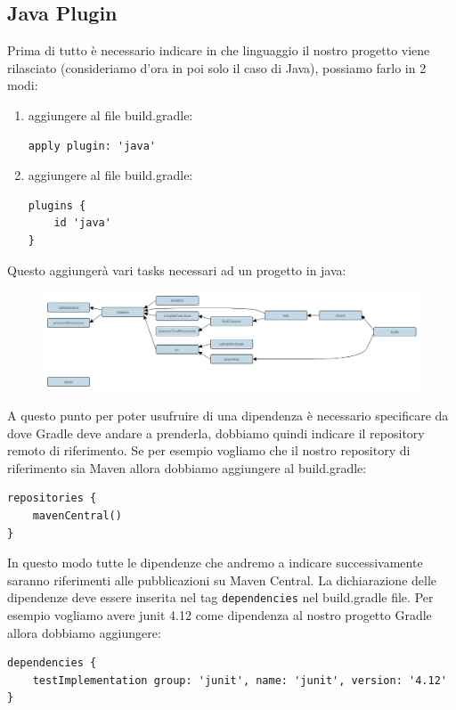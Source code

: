 \subsection{Java Plugin}
Prima di tutto è necessario indicare in che linguaggio il nostro progetto viene rilasciato (consideriamo d'ora in poi solo il caso di Java), possiamo farlo in 2 modi:
\begin{enumerate}
    \item aggiungere al file build.gradle:
    \begin{lstlisting}[frame=single]
apply plugin: 'java' \end{lstlisting}
    \item aggiungere al file build.gradle:
    \begin{lstlisting}[frame=single]
plugins {
    id 'java'
}
    \end{lstlisting}
\end{enumerate}
Questo aggiungerà vari tasks necessari ad un progetto in java:
\begin{figure}[H]
    \centering
    \includegraphics[width=1.0\linewidth]{3DependencyManagement/javaPlug/javaPluginTasks.png}
\end{figure}
A questo punto per poter usufruire di una dipendenza è necessario specificare da dove Gradle deve andare a prenderla, dobbiamo quindi indicare il repository remoto di riferimento. Se per esempio vogliamo che il nostro repository di riferimento sia Maven allora dobbiamo aggiungere al build.gradle:
\begin{lstlisting}[frame=single]
repositories {
    mavenCentral()
} \end{lstlisting}
In questo modo tutte le dipendenze che andremo a indicare successivamente saranno riferimenti alle pubblicazioni su Maven Central. La dichiarazione delle dipendenze deve essere inserita nel tag \texttt{dependencies} nel build.gradle file. Per esempio vogliamo avere junit 4.12 come dipendenza al nostro progetto Gradle allora dobbiamo aggiungere:
\begin{lstlisting}[frame=single]
dependencies {
    testImplementation group: 'junit', name: 'junit', version: '4.12' 
} \end{lstlisting}
